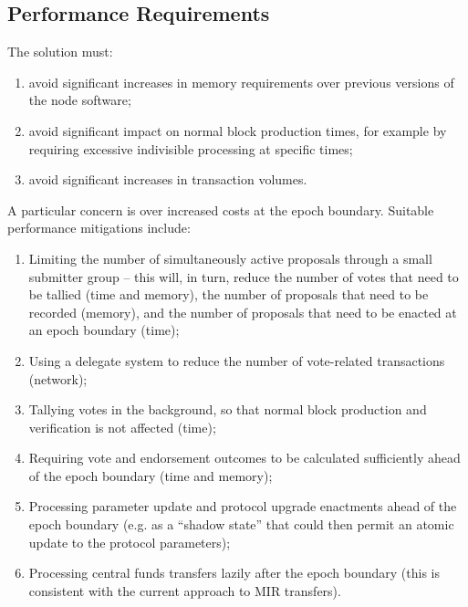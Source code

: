 \pagebreak
\subsection{Performance Requirements}
\label{sect:performance}

The solution must:

\begin{enumerate}
\item
  avoid significant increases in memory requirements over previous versions of the node software;
\item
  avoid significant impact on normal block production times, for example by requiring excessive indivisible processing at specific times;
\item
  avoid significant increases in transaction volumes.
\end{enumerate}

A particular concern is over increased costs at the epoch boundary.
%
Suitable performance mitigations include:

\begin{enumerate}
\item
  Limiting the number of simultaneously active proposals through a small submitter group
  -- this will, in turn, reduce the number of votes that need to be tallied (time and memory),  the number of proposals that need to be recorded (memory), and the number of proposals that need to be enacted at an epoch boundary (time);
\item
  Using a delegate system to reduce the number of vote-related transactions (network);
\item
  Tallying votes in the background, so that normal block production and verification is not affected (time);
\item
  Requiring vote and endorsement outcomes to be calculated sufficiently ahead of the epoch boundary (time and memory);
\item
  Processing parameter update and protocol upgrade enactments ahead of the epoch boundary (e.g. as a ``shadow state'' that could then permit an atomic update to the protocol parameters);
\item
  Processing central funds transfers lazily after the epoch boundary (this is consistent with the current approach to MIR transfers).
\end{enumerate}
